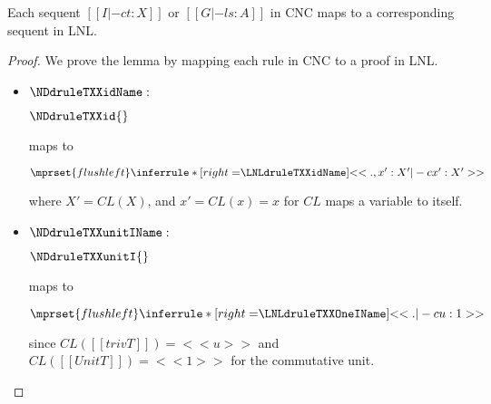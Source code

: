 \begin{lemma}
  Each sequent $[[I |-c t : X]]$ or $[[G |-l s : A]]$ in CNC maps to a
  corresponding sequent in LNL.
\end{lemma}
\begin{proof}
  We prove the lemma by mapping each rule in CNC to a proof in LNL.
  \begin{itemize}
    \item $\NDdruleTXXidName:$
          \begin{center}
            \footnotesize
            $\NDdruleTXXid{}$
          \end{center}
          maps to
          \begin{center}
            \footnotesize
            \begin{math}
              $$\mprset{flushleft}
              \inferrule* [right=$\LNLdruleTXXidName$] {
                \\
              }{<<., x' : X' |-c x' : X'>>}
            \end{math}
          \end{center}
          where $X'=CL(X)$, and $x'=CL(x)=x$ for $CL$ maps a variable to
          itself.

    \item $\NDdruleTXXunitIName:$
          \begin{center}
           \footnotesize
           $\NDdruleTXXunitI{}$
          \end{center}
          maps to
          \begin{center}
            \footnotesize
            \begin{math}
              $$\mprset{flushleft}
              \inferrule* [right=$\LNLdruleTXXOneIName$] {
                \\
              }{<<. |-c u : 1>>}
            \end{math}
          \end{center}
          since $CL([[trivT]]) = <<u>>$ and $CL([[UnitT]]) = <<1>>$ for
          the commutative unit.


\end{itemize}
\end{proof}
